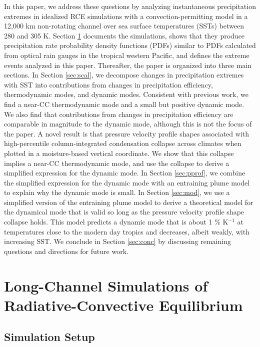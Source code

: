 \documentclass[twocol]{ametsoc}
\begin{document}
In this paper, we address these questions by analyzing instantaneous precipitation extremes in idealized RCE simulations with a convection-permitting model in a 12,000 km non-rotating channel over sea surface temperatures (SSTs) between 280 and 305 K. Section \ref{sec:lcs} documents the simulations, shows that they produce precipitation rate probability density functions (PDFs) similar to PDFs calculated from optical rain gauges in the tropical western Pacific, and defines the extreme events analyzed in this paper. Thereafter, the paper is organized into three main sections. In Section \ref{sec:scal}, we decompose changes in precipitation extremes with SST into contributions from changes in precipitation efficiency, thermodynamic modes, and dynamic modes. Consistent with previous work, we find a near-CC thermodynamic mode and a small but positive dynamic mode. We also find that contributions from changes in precipitation efficiency are comparable in magnitude to the dynamic mode, although this is not the focus of the paper. A novel result is that pressure velocity profile shapes associated with high-percentile column-integrated condensation collapse across climates when plotted in a moisture-based vertical coordinate. We show that this collapse implies a near-CC thermodynamic mode, and use the collapse to derive a simplified expression for the dynamic mode. In Section \ref{sec:pprof}, we combine the simplified expression for the dynamic mode with an entraining plume model to explain why the dynamic mode is small. In Section \ref{sec:mod}, we use a simplified version of the entraining plume model to derive a theoretical model for the dynamical mode that is valid so long as the pressure velocity profile shape collapse holds. This model predicts a dynamic mode that is about 1 \% K$^{-1}$ at temperatures close to the modern day tropics and decreases, albeit weakly, with increasing SST. We conclude in Section \ref{sec:conc} by discussing remaining questions and directions for future work.

\section{Long-Channel Simulations of Radiative-Convective Equilibrium} \label{sec:lcs}
\subsection{Simulation Setup}
\end{document}
